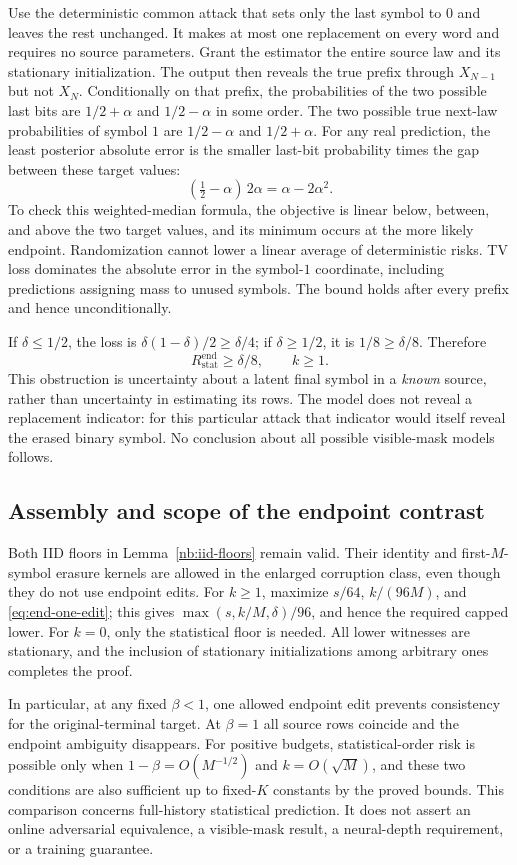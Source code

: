 Use the deterministic common attack that sets only the last symbol to
$0$ and leaves the rest unchanged.  It makes at most one replacement
on every word and requires no source parameters.  Grant the estimator
the entire source law and its stationary initialization.  The output
then reveals the true prefix through $X_{N-1}$ but not $X_N$.
Conditionally on that prefix, the probabilities of the two possible
last bits are $1/2+\alpha$ and $1/2-\alpha$ in some order.  The two
possible true next-law probabilities of symbol $1$ are
$1/2-\alpha$ and $1/2+\alpha$.
For any real prediction, the least posterior absolute error is the
smaller last-bit probability times the gap between these target values:
\[
 (\tfrac12-\alpha)\,2\alpha=\alpha-2\alpha^2.
\]
To check this weighted-median formula, the objective is linear below,
between, and above the two target values, and its minimum occurs at
the more likely endpoint.  Randomization cannot lower a linear average
of deterministic risks.  TV loss dominates the absolute error in the
symbol-$1$ coordinate, including predictions assigning mass to unused
symbols.  The bound holds after every prefix and hence unconditionally.

If $\delta\leq1/2$, the loss is
$\delta(1-\delta)/2\geq\delta/4$; if $\delta\geq1/2$, it is
$1/8\geq\delta/8$.  Therefore
\begin{equation}\label{eq:end-one-edit}
 R_{\mathrm{stat}}^{\mathrm{end}}\geq\delta/8,
 \qquad k\geq1.
\end{equation}
This obstruction is uncertainty about a latent final symbol in a
\emph{known} source, rather than uncertainty in estimating its rows.
The model does not reveal a replacement indicator: for this particular
attack that indicator would itself reveal the erased binary symbol.
No conclusion about all possible visible-mask models follows.

\subsection{Assembly and scope of the endpoint contrast}
Both IID floors in Lemma~\ref{nb:iid-floors} remain valid.  Their
identity and first-$M$-symbol erasure kernels are allowed in the enlarged
corruption class, even though they do not use endpoint edits.
For $k\geq1$, maximize $s/64$, $k/(96M)$, and
\eqref{eq:end-one-edit}; this gives
$\max(s,k/M,\delta)/96$, and hence the required capped lower.
For $k=0$, only the statistical floor is needed.
All lower witnesses are stationary, and the inclusion of stationary
initializations among arbitrary ones completes the proof.

In particular, at any fixed $\beta<1$, one allowed endpoint edit
prevents consistency for the original-terminal target.  At $\beta=1$
all source rows coincide and the endpoint ambiguity disappears.
For positive budgets, statistical-order risk is possible only when
$1-\beta=O(M^{-1/2})$ and $k=O(\sqrt M)$, and these two conditions
are also sufficient up to fixed-$K$ constants by the proved bounds.
This comparison concerns full-history statistical prediction.  It does
not assert an online adversarial equivalence, a visible-mask result,
a neural-depth requirement, or a training guarantee.
